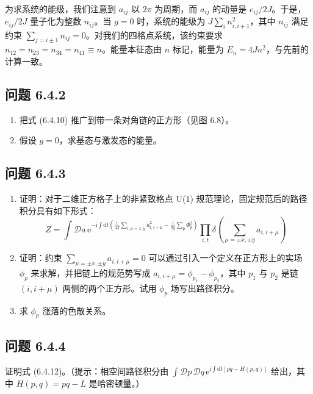 为求系统的能级，我们注意到 $a_{ij}$ 以 $2\pi$ 为周期，而 $a_{ij}$ 的动量是 $e_{ij}/2J$。于是，$e_{ij}/2J$ 量子化为整数 $n_{ij}$。当 $g=0$ 时，系统的能级为 $J\sum_{i}n_{i,i+1}^{2}$，其中 $n_{ij}$ 满足约束 $\sum_{j=i\pm1}n_{ij}=0$。对我们的四格点系统，该约束要求 $n_{12}=n_{23}=n_{34}=n_{41}\equiv n$。能量本征态由 $n$ 标记，能量为 $E_{n}=4Jn^{2}$，与先前的计算一致。

\subsection*{问题 6.4.2}

\begin{enumerate}
\item[(a)] 把式 (6.4.10) 推广到带一条对角链的正方形（见图 6.8）。
\item[(b)] 假设 $g=0$，求基态与激发态的能量。
\end{enumerate}

\subsection*{问题 6.4.3}

\begin{enumerate}
\item[(a)] 证明：对于二维正方格子上的非紧致格点 U(1) 规范理论，固定规范后的路径积分具有如下形式：
\begin{equation*}
Z=\int\mathcal{D}a\,\mathrm{e}^{-\mathrm{i}\int\mathrm{d}t\left(\frac{1}{4J}\sum_{i,\mu=x,y}\dot{a}_{i,i+\mu}^{2}-\frac{1}{2g}\sum_{p}\Phi_{p}^{2}\right)}\prod_{i,t}\delta\left(\sum_{\mu=\pm x,\pm y}a_{i,i+\mu}\right)
\end{equation*}
\item[(b)] 证明：约束 $\sum_{\mu=\pm x,\pm y}a_{i,i+\mu}=0$ 可以通过引入一个定义在正方形上的实场 $\phi_{p}$ 来求解，并把链上的规范势写成 $a_{i,i+\mu}=\phi_{p_{1}}-\phi_{p_{2}}$，其中 $p_{1}$ 与 $p_{2}$ 是链 $(i,i+\mu)$ 两侧的两个正方形。试用 $\phi_{p}$ 场写出路径积分。
\item[(c)] 求 $\phi_{p}$ 涨落的色散关系。
\end{enumerate}

\subsection*{问题 6.4.4}

证明式 (6.4.12)。（提示：相空间路径积分由 $\int\mathcal{D}p\,\mathcal{D}q\,\mathrm{e}^{\mathrm{i}\int\mathrm{d}t[p\dot{q}-H(p,q)]}$ 给出，其中 $H(p,q)=p\dot{q}-L$ 是哈密顿量。）


